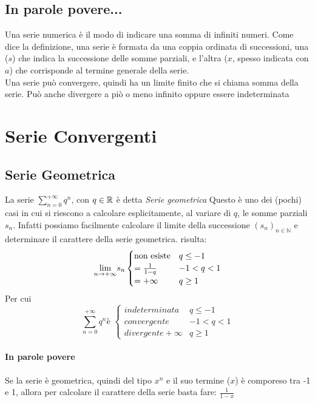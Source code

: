 \subsection*{In parole povere...}
Una serie numerica è il modo di indicare una somma di infiniti numeri.
Come dice la definizione, una serie è formata da una coppia ordinata di successioni, una ($s$) che indica la successione delle somme parziali, e l'altra ($x$, spesso indicata con $a$) che corrisponde al termine generale della serie.
\\Una serie può convergere, quindi ha un limite finito che si chiama somma della serie. Può anche divergere a piò o meno infinito oppure essere indeterminata
\section{Serie Convergenti}
\subsection{Serie Geometrica}
La serie $\sum_{n=0}^{+\infty} q^n$, con $q \in \mathbb{R}$ è detta \emph{Serie geometrica}
Questo è uno dei (pochi) casi in cui si riescono a calcolare esplicitamente, al variare di $q$, le somme parziali $s_n$.
Infatti possiamo facilmente calcolare il limite della successione $(s_n)_{n\in \mathbb{N}}$ e determinare il carattere della serie geometrica.
risulta:
\begin{equation}
	\underset{n \to +\infty}{\lim} s_n \begin{cases}
		\text{non esiste} & q \leq -1  \\
		= \frac{1}{1-q}   & -1 < q < 1 \\
		= +\infty         & q \geq 1
	\end{cases}
\end{equation}
Per cui
	\begin{equation}
		\sum_{n=0}^{+\infty} q^n \text{è } \begin{cases}
			indeterminata      & q \leq -1  \\
			convergente        & -1 < q < 1 \\
			divergente +\infty & q \geq 1
		\end{cases}
	\end{equation}


\paragraph{In parole povere}
Se la serie è geometrica, quindi del tipo $x^n$ e il suo termine ($x$) è comporeso tra -1 e 1, allora per calcolare il carattere della serie basta fare: $\frac{1}{1-x}$
\\
